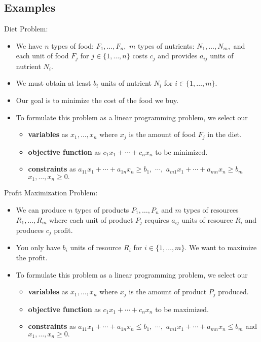 \documentclass[a4paper,12pt]{article}
\begin{document}
\subsection{Examples}
Diet Problem:
\begin{itemize}
    \item We have $n$ types of food: $F_1,\dots,F_n,$ $m$ types of nutrients: $N_1,\dots,N_m,$ and each unit of food $F_j$ for $j\in\{1,\dots,n\}$ costs $c_j$ and provides $a_{ij}$ units of nutrient $N_i.$
    \item We must obtain at least $b_i$ units of nutrient $N_i$ for $i\in\{1,\dots,m\}.$
    \item Our goal is to minimize the cost of the food we buy.
    \item To formulate this problem as a linear programming problem, we select our \begin{itemize}
        \item \textbf{variables} as $x_1,\dots,x_n$ where $x_j$ is the amount of food $F_j$ in the diet. 
        \item \textbf{objective function} as $c_1x_1+\cdots+c_nx_n$ to be minimized.
        \item \textbf{constraints} as $a_{11}x_1+\cdots+a_{1n}x_n\geq b_1,$ $\cdots,$ $a_{m1}x_1+\cdots+a_{mn}x_n\geq b_m$  $x_1,\dots,x_n\geq 0.$
    \end{itemize}
\end{itemize}
Profit Maximization Problem:
\begin{itemize}
    \item We can produce $n$ types of products $P_1,\dots,P_n$ and $m$ types of resources $R_1,\dots,R_m$ where each unit of product $P_j$ requires $a_{ij}$ units of resource $R_i$ and produces $c_j$ profit.
    \item You only have $b_i$ units of resource $R_i$ for $i\in\{1,\dots,m\}.$ We want to maximize the profit.
    \item To formulate this problem as a linear programming problem, we select our \begin{itemize}
        \item \textbf{variables} as $x_1,\dots,x_n$ where $x_j$ is the amount of product $P_j$ produced. 
        \item \textbf{objective function} as $c_1x_1+\cdots+c_nx_n$ to be maximized.
        \item \textbf{constraints} as $a_{11}x_1+\cdots+a_{1n}x_n\leq b_1,$ $\cdots,$ $a_{m1}x_1+\cdots+a_{mn}x_n\leq b_m$ and $x_1,\dots,x_n\geq 0.$
    \end{itemize}
\end{itemize}
\end{document}
